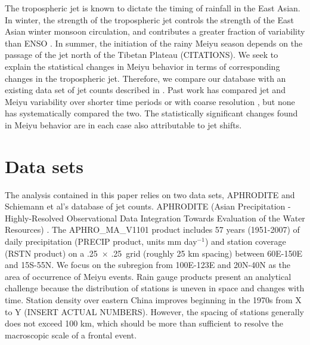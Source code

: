 \documentclass[draft,grl]{AGUTeX}
\begin{document}
\begin{article}
	The tropospheric jet is known to dictate the timing of rainfall in the East Asian. In winter, the strength of the tropospheric jet controls the strength of the East Asian winter monsoon circulation, and contributes a greater fraction of variability than ENSO \citep{Yang2002}. In summer, the initiation of the rainy Meiyu season depends on the passage of the jet north of the Tibetan Plateau (CITATIONS). We seek to explain the statistical changes in Meiyu behavior in terms of corresponding changes in the tropospheric jet. Therefore, we compare our database with an existing data set of jet counts described in \citet{Schiemann2009}. Past work has compared jet and Meiyu variability over shorter time periods or with coarse resolution \citep{Liang1998}, but none has systematically compared the two. The statistically significant changes found in Meiyu behavior are in each case also attributable to jet shifts.

	
\section{Data sets}

	The analysis contained in this paper relies on two data sets, APHRODITE and Schiemann et al's database of jet counts. APHRODITE (Asian Precipitation - Highly-Resolved Observational Data Integration Towards Evaluation of the Water Resources) \citep{Yatagai2012}. The APHRO\_MA\_V1101 product includes 57 years (1951-2007) of daily precipitation (PRECIP product, units mm day$^{-1}$) and station coverage (RSTN product) on a .25\textdegree\ $\times$ .25\textdegree\ grid (roughly 25 km spacing) between 60\textdegree E-150\textdegree E and 15\textdegree S-55\textdegree N. We focus on the subregion from 100E-123E and 20N-40N as the area of occurrence of Meiyu events. Rain gauge products present an analytical challenge because the distribution of stations is uneven in space and changes with time. Station density over eastern China improves beginning in the 1970s from X to Y (INSERT ACTUAL NUMBERS). However, the spacing of stations generally does not exceed 100 km, which should be more than sufficient to resolve the macroscopic scale of a frontal event.


\end{article}
\end{document}
